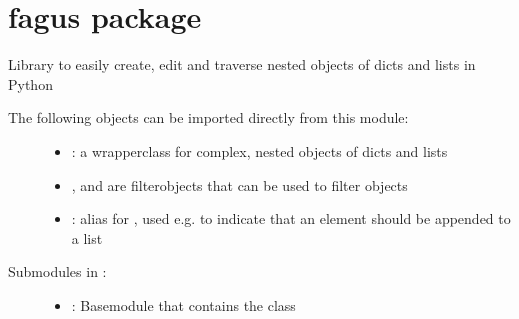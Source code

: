\documentclass[a4paper,10pt,english]{sphinxmanual}
\begin{document}
\chapter{fagus package}
\label{\detokenize{fagus:module-fagus}}\label{\detokenize{fagus:fagus-package}}\label{\detokenize{fagus::doc}}
\sphinxAtStartPar
Library to easily create, edit and traverse nested objects of dicts and lists in Python
\begin{description}
\item[{The following objects can be imported directly from this module:}] \leavevmode\begin{itemize}
\item {}
\sphinxAtStartPar
{\hyperref[\detokenize{fagus:fagus.Fagus}]{}}: a wrapper\sphinxhyphen{}class for complex, nested objects of dicts and lists

\item {}
\sphinxAtStartPar
{\hyperref[\detokenize{fagus.filters:fagus.filters.Fil}]{}}, {\hyperref[\detokenize{fagus.filters:fagus.filters.CFil}]{}} and {\hyperref[\detokenize{fagus.filters:fagus.filters.VFil}]{}} are filter\sphinxhyphen{}objects that can
be used to filter {\hyperref[\detokenize{fagus:fagus.Fagus}]{}}\sphinxhyphen{}objects

\item {}
\sphinxAtStartPar
{}: alias for , used e.g. to indicate that an element should be appended to
a list

\end{itemize}

\item[{Submodules in {\hyperref[\detokenize{fagus:module-fagus}]{}}:}] \leavevmode\begin{itemize}
\item {}
\sphinxAtStartPar
{\hyperref[\detokenize{fagus.fagus:module-fagus.fagus}]{}}: Base\sphinxhyphen{}module that contains the {\hyperref[\detokenize{fagus:fagus.Fagus}]{}}\sphinxhyphen{}class


\end{itemize}
\end{description}
\end{document}
